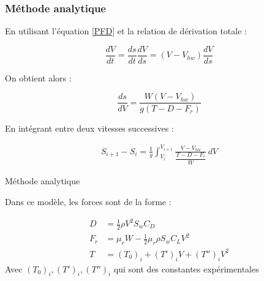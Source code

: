 	
	
	\begin{frame}
		
		\frametitle{Méthode analytique}
		
		En utilisant l'équation \ref{PFD} et la relation de dérivation totale :
		
		\begin{equation}
			\frac{ dV}{dt}=\frac{ds}{dt}\frac{dV}{ds}=(V-V_{hw})\frac{dV}{ds}
		\end{equation}
		
		On obtient alors :
		
		\begin{equation}
			\frac{ds}{dV}=\frac{W(V-V_{hw})}{g(T-D-F_r)}
		\end{equation}
		
		En intégrant entre deux vitesses successives :
		
		\begin{align}
			S_{i+1}-S_i=
			\frac{1}{g}
			\int_{V_i}^{V_{i+1}}
			\frac{V-V_{hw}}
			{\dfrac{T-D-F_r}{W}}
			\, dV
		\end{align}
		
	\end{frame}
	
	
	\begin{frame}{Méthode analytique}
		
		Dans ce modèle, les forces sont de la forme :
		
		\begin{align}
			D &= \frac{1}{2}\rho V^2 S_w C_D \\
			F_r &= \mu_r W - \frac{1}{2}\mu_r \rho S_w C_L V^2 \\
			T &= (T_0)_i + (T')_i V + (T'')_i V^2 
		\end{align}
		Avec $ (T_0)_i , (T')_i , (T'')_i $ qui sont des constantes expérimentales
		
	\end{frame}
	


	

	
